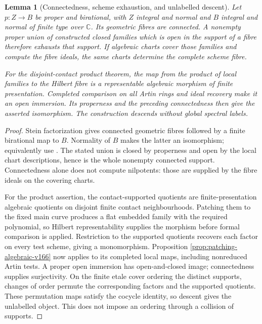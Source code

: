 \documentclass[11pt,reqno]{amsart}
\numberwithin{equation}{section}
\newtheorem{lemma}[theorem]{Lemma}
\theoremstyle{definition}\newtheorem{definition}[theorem]{Definition}
\theoremstyle{remark}\newtheorem{remark}[theorem]{Remark}
\newcommand{\C}{\mathbb C}\newcommand{\Q}{\mathbb Q}
\begin{document}
\begin{lemma}[Connectedness, scheme exhaustion, and unlabelled descent]
\label{lem:exhaustion-v166}
Let $p:Z\to B$ be proper and birational, with $Z$ integral and
normal and $B$ integral and normal of finite type over $\C$.
Its geometric fibres are connected. A nonempty proper union of
constructed closed families which is open in the support of a
fibre therefore exhausts that support. If algebraic charts cover
those families and compute the fibre ideals, the same charts
determine the complete scheme fibre.

For the disjoint-contact product theorem, the map from the product
of local families to the Hilbert fibre is a representable algebraic
morphism of finite presentation. Completed comparison on all Artin
rings and ideal recovery make it an open immersion. Its properness
and the preceding connectedness then give the asserted isomorphism.
The construction descends without global spectral labels.
\end{lemma}
\begin{proof}
Stein factorization gives connected geometric fibres followed by
a finite birational map to $B$. Normality of $B$ makes the latter
an isomorphism; equivalently use
\cite[Lemma 37.53.6]{Stacks163}. The stated union is closed by
properness and open by the local chart descriptions, hence is the
whole nonempty connected support. Connectedness alone does not
compute nilpotents: those are supplied by the fibre ideals on the
covering charts.

For the product assertion, the contact-supported quotients are
finite-presentation algebraic quotients on disjoint finite contact
neighbourhoods. Patching them to the fixed main curve produces a
flat embedded family with the required polynomial, so Hilbert
representability supplies the morphism before formal comparison
is applied. Restriction to the supported quotients recovers each
factor on every test scheme, giving a monomorphism. Proposition
\ref{prop:patching-algebraic-v166} now applies to its completed
local maps, including nonreduced Artin tests. A proper open immersion
has open-and-closed image; connectedness supplies surjectivity.
On the finite etale cover ordering the distinct supports, changes
of order permute the corresponding factors and the supported
quotients. These permutation maps satisfy the cocycle identity,
so descent gives the unlabelled object. This does not impose an
ordering through a collision of supports.
\end{proof}
\end{document}
